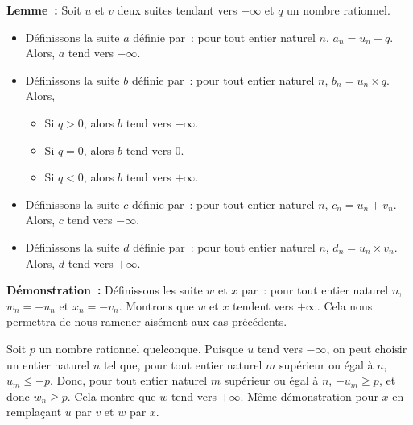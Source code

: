 \done

\medskip

\noindent\textbf{Lemme :} Soit $u$ et $v$ deux suites tendant vers $-\infty$ et $q$ un nombre rationnel.
    \begin{itemize}[nosep]
        \item Définissons la suite $a$ définie par : pour tout entier naturel $n$, $a_n = u_n + q$.
            Alors, $a$ tend vers $-\infty$.
        \item Définissons la suite $b$ définie par : pour tout entier naturel $n$, $b_n = u_n \times q$.
            Alors, 
            \begin{itemize}[nosep]
                \item Si $q > 0$, alors $b$ tend vers $-\infty$.
                \item Si $q = 0$, alors $b$ tend vers $0$.
                \item Si $q < 0$, alors $b$ tend vers $+\infty$.
            \end{itemize}
        \item Définissons la suite $c$ définie par : pour tout entier naturel $n$, $c_n = u_n + v_n$.
            Alors, $c$ tend vers $-\infty$.
        \item Définissons la suite $d$ définie par : pour tout entier naturel $n$, $d_n = u_n \times v_n$.
            Alors, $d$ tend vers $+\infty$.
    \end{itemize}

\medskip

\noindent\textbf{Démonstration :} Définissons les suite $w$ et $x$ par : pour tout entier naturel $n$, $w_n = -u_n$ et $x_n = -v_n$.
    Montrons que $w$ et $x$ tendent vers $+\infty$. 
    Cela nous permettra de nous ramener aisément aux cas précédents.

    Soit $p$ un nombre rationnel quelconque.
    Puisque $u$ tend vers $-\infty$, on peut choisir un entier naturel $n$ tel que, pour tout entier naturel $m$ supérieur ou égal à $n$, $u_m \leq -p$. 
    Donc, pour tout entier naturel $m$ supérieur ou égal à $n$, $- u_m \geq p$, et donc $w_n \geq p$.
    Cela montre que $w$ tend vers $+\infty$.
    Même démonstration pour $x$ en remplaçant $u$ par $v$ et $w$ par $x$.


